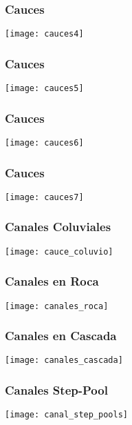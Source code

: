 \documentclass{beamer}
\begin{document}
\begin{frame}
\frametitle{Cauces}
\begin{center}
   	\texttt{[image: cauces4]}
\end{center}
\end{frame}
\begin{frame}
\frametitle{Cauces}
\begin{center}
   	\texttt{[image: cauces5]}
\end{center}
\end{frame}
\begin{frame}
\frametitle{Cauces}
\begin{center}
   	\texttt{[image: cauces6]}
\end{center}
\end{frame}
\begin{frame}
\frametitle{Cauces}
\begin{center}
   	\texttt{[image: cauces7]}
\end{center}
\end{frame}
\begin{frame}
\frametitle{Canales Coluviales}
\begin{center}
   	\texttt{[image: cauce\_coluvio]}
\end{center}
\end{frame}
\begin{frame}
\frametitle{Canales en Roca}
\begin{center}
   	\texttt{[image: canales\_roca]}
\end{center}
\end{frame}
\begin{frame}
\frametitle{Canales en Cascada}
\begin{center}
   	\texttt{[image: canales\_cascada]}
\end{center}
\end{frame}
\begin{frame}
\frametitle{Canales Step-Pool}
\begin{center}
   	\texttt{[image: canal\_step\_pools]}
\end{center}
\end{frame}
\end{document}
